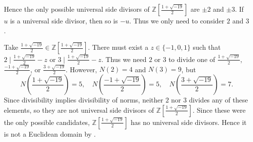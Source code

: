 \documentclass[a4paper,12pt]{report}
\begin{document}
Hence the only possible universal side divisors of $\mathbb{Z}\left[\frac{1+\sqrt{-19}}{2}\right]$ are $\pm2$ and $\pm 3$. If $u$ is a universal side divisor, then so is $-u$. Thus we only need to consider $2$ and $3$. 

Take $\frac{1+\sqrt{-19}}{2}\in\mathbb{Z}\left[\frac{1+\sqrt{-19}}{2}\right]$. There must exist a $z\in\{-1,0,1\}$ such that $2\mid \frac{1+\sqrt{-19}}{2}-z$ or $3\mid \frac{1+\sqrt{-19}}{2}-z$. Thus we need $2$ or $3$ to divide one of $\frac{1+\sqrt{-19}}{2}$, $\frac{-1+\sqrt{-19}}{2}$, or $\frac{3+\sqrt{-19}}{2}$. However, $N(2)=4$ and $N(3)=9$, but
\[
    N\left(\frac{1+\sqrt{-19}}{2}\right)=5, \quad N\left(\frac{-1+\sqrt{-19}}{2}\right)=5, \quad N\left(\frac{3+\sqrt{-19}}{2}\right)=7.
\]
Since divisibility implies divisibility of norms, neither $2$ nor $3$ divides any of these elements, so they are not universal side divisors of $\mathbb{Z}\left[\frac{1+\sqrt{-19}}{2}\right]$. Since these were the only possible candidates, $\mathbb{Z}\left[\frac{1+\sqrt{-19}}{2}\right]$ has no universal side divisors. Hence it is not a Euclidean domain by .
\end{document}
